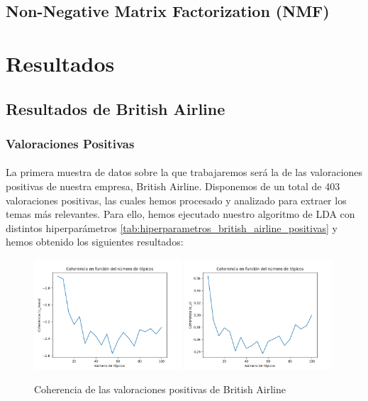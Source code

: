 \documentclass{report}
\begin{document}
{{            \subsection{Non-Negative Matrix Factorization (NMF)}
        \clearpage\section{Resultados}
            \subsection{Resultados de British Airline}
                \subsubsection*{Valoraciones Positivas}
                    \paragraph*{}{
                        La primera muestra de datos sobre la que trabajaremos será la de las valoraciones positivas de nuestra empresa, British Airline.
                        Disponemos de un total de 403 valoraciones positivas, las cuales hemos procesado y analizado para extraer los temas más relevantes.
                        Para ello, hemos ejecutado nuestro algoritmo de LDA con distintos hiperparámetros \ref{tab:hiperparametros_british_airline_positivas} y hemos obtenido los siguientes resultados: 
                    }
                    \begin{figure}[H]
                        \centering
                        \includegraphics[width=0.49\textwidth]{./img/british_airline_positivas_umass.png}
                        \includegraphics[width=0.49\textwidth]{./img/british_airline_positivas_cv.png}
                        \caption{Coherencia de las valoraciones positivas de British Airline}
                    \end{figure}
}}
\end{document}
